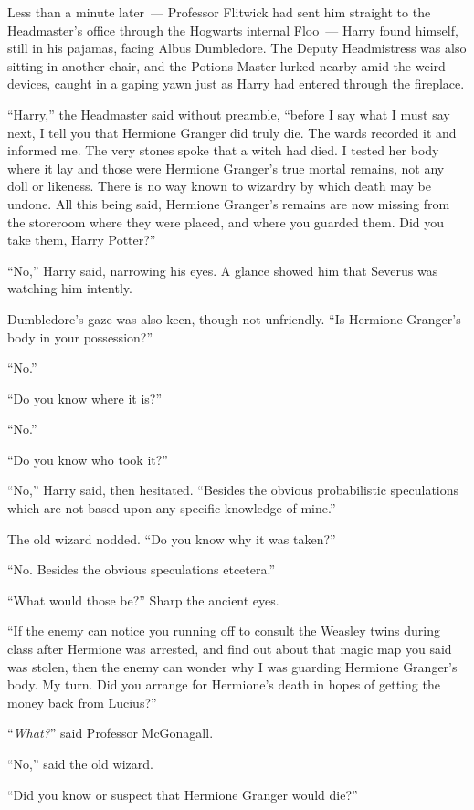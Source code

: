 Less than a minute later~--- Professor Flitwick had sent him straight to the Headmaster's office through the Hogwarts internal Floo~--- Harry found himself, still in his pajamas, facing Albus Dumbledore. The Deputy Headmistress was also sitting in another chair, and the Potions Master lurked nearby amid the weird devices, caught in a gaping yawn just as Harry had entered through the fireplace.

``Harry,'' the Headmaster said without preamble, ``before I say what I must say next, I tell you that Hermione Granger did truly die. The wards recorded it and informed me. The very stones spoke that a witch had died. I tested her body where it lay and those were Hermione Granger's true mortal remains, not any doll or likeness. There is no way known to wizardry by which death may be undone. All this being said, Hermione Granger's remains are now missing from the storeroom where they were placed, and where you guarded them. Did you take them, Harry Potter?''

``No,'' Harry said, narrowing his eyes. A glance showed him that Severus was watching him intently.

Dumbledore's gaze was also keen, though not unfriendly. ``Is Hermione Granger's body in your possession?''

``No.''

``Do you know where it is?''

``No.''

``Do you know who took it?''

``No,'' Harry said, then hesitated. ``Besides the obvious probabilistic speculations which are not based upon any specific knowledge of mine.''

The old wizard nodded. ``Do you know why it was taken?''

``No. Besides the obvious speculations etcetera.''

``What would those be?'' Sharp the ancient eyes.

``If the enemy can notice you running off to consult the Weasley twins during class after Hermione was arrested, and find out about that magic map you said was stolen, then the enemy can wonder why I was guarding Hermione Granger's body. My turn. Did you arrange for Hermione's death in hopes of getting the money back from Lucius?''

``\emph{What?}'' said Professor McGonagall.

``No,'' said the old wizard.

``Did you know or suspect that Hermione Granger would die?''

